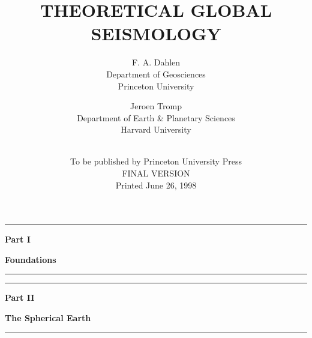 \documentclass[fleqn,openany]{book}
\begin{document}
\begin{CJK*}{UTF8}{gkai} 



\title{THEORETICAL GLOBAL SEISMOLOGY}
\author{F. A. Dahlen\\
Department of Geosciences\\
Princeton University\\
\and
Jeroen Tromp\\
Department of Earth \& Planetary Sciences\\
Harvard University \\ \\
}
\date{To be published by Princeton University Press \\
FINAL VERSION\\
Printed June 26, 1998}
\maketitle

\setcounter{page}{5}
\tableofcontents
\newpage{\pagestyle{empty}\cleardoublepage}



\newpage{\pagestyle{empty}\cleardoublepage}
\thispagestyle{empty}
\vspace*{22mm}
\begin{center}
\rule{\linewidth}{0.5mm}
\end{center}
\begin{center}
\huge{\textbf{Part I}}
\end{center}
\begin{center}
\Huge{\textbf{Foundations}}
\rule{\linewidth}{0.5mm}
\end{center}
\newpage{\pagestyle{empty}\cleardoublepage}








\newpage{\pagestyle{empty}\cleardoublepage}
\thispagestyle{empty}
\vspace*{22mm}
\begin{center}
\rule{\linewidth}{0.5mm}
\end{center}
\begin{center}
\huge{\textbf{Part II}}
\end{center}
\begin{center}
\Huge{\textbf{The Spherical Earth}}
\rule{\linewidth}{0.5mm}
\end{center}
\newpage{\pagestyle{empty}\cleardoublepage}


\end{CJK*}
\end{document}
